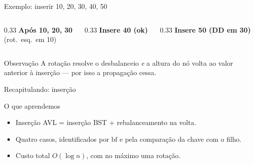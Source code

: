 \documentclass[aspectratio=169]{beamer}
\begin{document}
\begin{frame}{Exemplo: inserir 10, 20, 30, 40, 50}
  \begin{columns}[T]
    \begin{column}{0.33\textwidth}
      \centering \textbf{Após 10, 20, 30}\\
      {\scriptsize (rot.\ esq.\ em 10)}\\[2pt]
    \end{column}
    \begin{column}{0.33\textwidth}
      \centering \textbf{Insere 40 (ok)}\\[2pt]
    \end{column}
    \begin{column}{0.33\textwidth}
      \centering \textbf{Insere 50 (DD em 30)}\\[2pt]
    \end{column}
  \end{columns}
  \vspace{4pt}
  \begin{exampleblock}{Observação}
    A rotação resolve o desbalanceio \emph{e} a altura do nó volta ao
    valor anterior à inserção --- por isso a propagação cessa.
  \end{exampleblock}
\end{frame}

\begin{frame}{Recapitulando: inserção}
  \begin{block}{O que aprendemos}
    \begin{itemize}
      \item Inserção AVL = inserção BST + rebalanceamento na volta.
      \item Quatro casos, identificados por $\mathrm{bf}$ e pela
            comparação da chave com o filho.
      \item Custo total $O(\log n)$, com no máximo uma rotação.
    \end{itemize}
  \end{block}
\end{frame}
\end{document}
